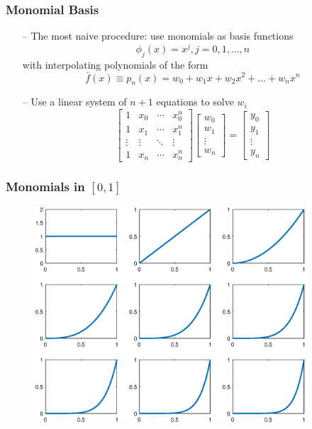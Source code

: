 \documentclass[aspectratio=169, 11pt]{beamer}
\begin{document}
\begin{frame}
\frametitle{Monomial Basis}
  \begin{itemize}
    \item[--] The most naive procedure: use monomials as basis functions
    \[
      \phi_{j}\left(x\right)=x^{j},j=0,1,\ldots,n
    \]
    with interpolating polynomials of the form
    \[
      \bar{f}\left(x\right)\equiv p_{n}\left(x\right)=w_{0}+w_{1}x+w_{2}x^{2}+\ldots+w_{n}x^{n}
    \]
    \item[--] Use a linear system of $n+1$ equations to solve $w_{i}$
    \[
      \left[\begin{array}{cccc}
      1 & x_{0} & \cdots & x_{0}^{n}\\
      1 & x_{1} & \cdots & x_{1}^{n}\\
      \vdots & \vdots & \ddots & \vdots\\
      1 & x_{n} & \cdots & x_{n}^{n}
      \end{array}\right]\left[\begin{array}{c}
      w_{0}\\
      w_{1}\\
      \vdots\\
      w_{n}
      \end{array}\right]=\left[\begin{array}{c}
      y_{0}\\
      y_{1}\\
      \vdots\\
      y_{n}
      \end{array}\right]
    \]
  \end{itemize}
\end{frame}

\begin{frame}
\frametitle{Monomials in $\left[0,1\right]$}
  \begin{figure}
    \centering
    \includegraphics[width = 4in]{monomial.eps}
  \end{figure}
\end{frame}
\end{document}
